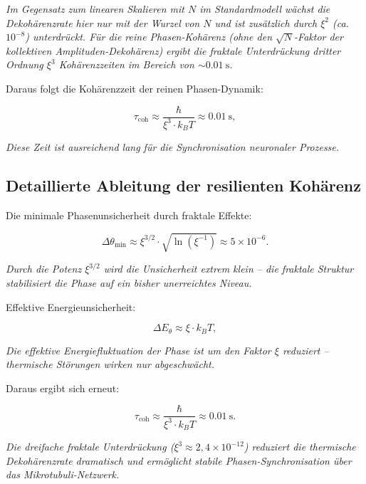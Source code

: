 	\textit{Im Gegensatz zum linearen Skalieren mit \(N\) im Standardmodell wächst die Dekohärenzrate hier nur mit der Wurzel von \(N\) und ist zusätzlich durch \(\xi^2\) (ca.\ \(10^{-8}\)) unterdrückt. Für die reine Phasen-Kohärenz (ohne den \(\sqrt{N}\)-Faktor der kollektiven Amplituden-Dekohärenz) ergibt die fraktale Unterdrückung dritter Ordnung \(\xi^3\) Kohärenzzeiten im Bereich von \(\sim \SI{0.01}{\second}\).}
	
	Daraus folgt die Kohärenzzeit der reinen Phasen-Dynamik:
	
	\begin{equation}
		\tau_{\text{coh}} \approx \frac{\hbar}{\xi^3 \cdot k_B T} \approx \SI{0.01}{\second},
	\end{equation}
	
	\textit{Diese Zeit ist ausreichend lang für die Synchronisation neuronaler Prozesse.}
	
	\subsection*{Detaillierte Ableitung der resilienten Kohärenz}
	
	Die minimale Phasenunsicherheit durch fraktale Effekte:
	
	\begin{equation}
		\Delta \theta_{\min} \approx \xi^{3/2} \cdot \sqrt{\ln(\xi^{-1})} \approx 5 \times 10^{-6}.
	\end{equation}
	
	\textit{Durch die Potenz \(\xi^{3/2}\) wird die Unsicherheit extrem klein – die fraktale Struktur stabilisiert die Phase auf ein bisher unerreichtes Niveau.}
	
	Effektive Energieunsicherheit:
	
	\begin{equation}
		\Delta E_{\theta} \approx \xi \cdot k_B T,
	\end{equation}
	
	\textit{Die effektive Energiefluktuation der Phase ist um den Faktor \(\xi\) reduziert – thermische Störungen wirken nur abgeschwächt.}
	
	Daraus ergibt sich erneut:
	
	\begin{equation}
		\tau_{\text{coh}} \approx \frac{\hbar}{\xi^3 \cdot k_B T} \approx \SI{0.01}{\second}.
	\end{equation}
	
	\textit{Die dreifache fraktale Unterdrückung (\(\xi^3 \approx 2{,}4 \times 10^{-12}\)) reduziert die thermische Dekohärenzrate dramatisch und ermöglicht stabile Phasen-Synchronisation über das Mikrotubuli-Netzwerk.}
	
